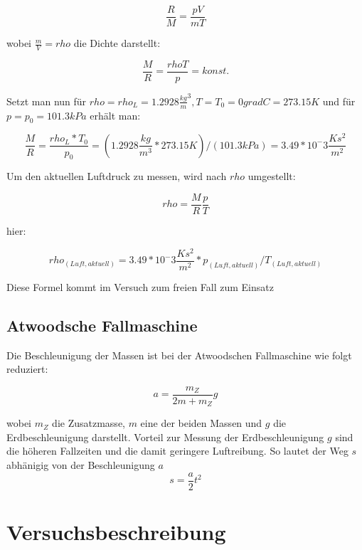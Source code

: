 \documentclass{protokoll}
\begin{document}
\begin{equation}
 \frac{R}{M} = \frac{pV}{mT} 
\end{equation}

wobei $\frac{m}{V} = rho$ die Dichte darstellt:

\begin{equation}
 \frac{M}{R} = \frac{rho T}{p} = konst.
\end{equation}

Setzt man nun für $ rho = rho_L = 1.2928 \frac{kg}{m}^3, 
T = T_0 = 0gradC = 273.15 K $ und für $ p = p_0 = 101.3 kPa $
erhält man:

\begin{equation}
 \frac{M}{R} = \frac{rho_L * T_0}{p_0} = (1.2928 \frac{kg}{m^3} * 273.15 K)/(101.3 kPa)
= 3.49 * 10^-3 \frac{Ks^2}{m^2} 
\end{equation}

Um den aktuellen Luftdruck zu messen, wird nach $rho$ umgestellt:

\begin{equation}
 rho = \frac{M}{R} \frac{p}{T} 
\end{equation}

hier:

\begin{equation}
 rho_(Luft, aktuell) = 3.49 * 10^-3 \frac{Ks^2}{m^2} * 
p_(Luft, aktuell)/T_(Luft, aktuell) 
\end{equation}

Diese Formel kommt im Versuch zum freien Fall zum Einsatz

\subsection{Atwoodsche Fallmaschine}

Die Beschleunigung der Massen ist bei der Atwoodschen Fallmaschine 
wie folgt reduziert:

\begin{equation}
 a = \frac{m_Z}{2m + m_Z} g 
\end{equation}

wobei $m_Z$ die Zusatzmasse, $ m $ eine der beiden Massen und 
$g$ die Erdbeschleunigung darstellt. 
Vorteil zur Messung der Erdbeschleunigung $g$ sind die höheren
Fallzeiten und die damit geringere Luftreibung.
So lautet der Weg $s$ abhänigig von der Beschleunigung $a$
\begin{equation}
 s = \frac{a}{2} t^2 
\end{equation}

\section{Versuchsbeschreibung}
\end{document}
